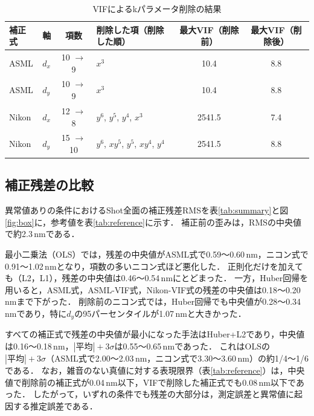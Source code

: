 \documentclass[11pt,a4paper]{ltjsarticle}
\begin{document}
\begin{table}[tb]
  \centering
  \caption{VIFによるkパラメータ削除の結果}
  \label{tab:vif}
  \begin{tabular}{llclcc}
    \toprule
    補正式 & 軸 & 項数 & 削除した項（削除した順） & 最大VIF（削除前） & 最大VIF（削除後） \\
    \midrule
    ASML & $d_x$ & 10 $\to$ 9 & $x^{3}$ & 10.4 & 8.8 \\
    ASML & $d_y$ & 10 $\to$ 9 & $x^{3}$ & 10.4 & 8.8 \\
    Nikon & $d_x$ & 12 $\to$ 8 & $y^{6}$, $y^{5}$, $y^{4}$, $x^{3}$ & 2541.5 & 7.4 \\
    Nikon & $d_y$ & 15 $\to$ 10 & $y^{6}$, $xy^{5}$, $y^{5}$, $xy^{4}$, $y^{4}$ & 2541.5 & 8.8 \\
    \bottomrule
  \end{tabular}
\end{table}

\subsection{補正残差の比較}

異常値ありの条件におけるShot全面の補正残差RMSを表\ref{tab:summary}と図\ref{fig:box}に，参考値を表\ref{tab:reference}に示す．
補正前の歪みは，RMSの中央値で約2.3\,nmである．

最小二乗法（OLS）では，残差の中央値がASML式で0.59〜0.60\,nm，ニコン式で0.91〜1.02\,nmとなり，項数の多いニコン式ほど悪化した．
正則化だけを加えても（L2，L1），残差の中央値は0.46〜0.54\,nmにとどまった．
一方，Huber回帰を用いると，ASML式，ASML-VIF式，Nikon-VIF式の残差の中央値は0.18〜0.20\,nmまで下がった．
削除前のニコン式では，Huber回帰でも中央値が0.28〜0.34\,nmであり，特に$d_y$の95パーセンタイルが1.07\,nmと大きかった．

すべての補正式で残差の中央値が最小になった手法はHuber+L2であり，中央値は0.16〜0.18\,nm，$|\text{平均}|+3\sigma$は0.55〜0.65\,nmであった．
これはOLSの$|\text{平均}|+3\sigma$（ASML式で2.00〜2.03\,nm，ニコン式で3.30〜3.60\,nm）の約1/4〜1/6である．
なお，雑音のない真値に対する表現限界（表\ref{tab:reference}）は，中央値で削除前の補正式が0.04\,nm以下，VIFで削除した補正式でも0.08\,nm以下であった．
したがって，いずれの条件でも残差の大部分は，測定誤差と異常値に起因する推定誤差である．
\end{document}
